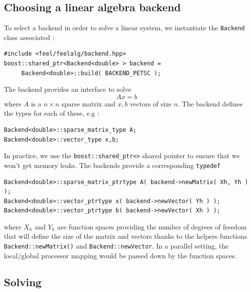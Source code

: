 \subsection{Choosing a linear algebra backend}
\label{sec:choos-line-algebra}

To select a backend in order to solve a linear system, we instantiate
the \lstinline!Backend! class associated :
\begin{lstlisting}
#include <feel/feelalg/backend.hpp>
boost::shared_ptr<Backend<double> > backend =
     Backend<double>::build( BACKEND_PETSC );
\end{lstlisting}
The backend provides an interface to solve
\begin{equation}
  \label{eq:8}
  A x = b
\end{equation}
where $A$ is a $n \times n $ sparse matrix and $x,b$ vectors of size $n$. The backend defines the \cpp types for  each of these, e.g :
\begin{lstlisting}
Backend<double>::sparse_matrix_type A;
Backend<double>::vector_type x,b;
\end{lstlisting}
In practice, we use the \lstinline!boost::shared_ptr<>! shared pointer
to ensure that we won't get memory leaks. The backends provide a
corresponding \lstinline!typedef!

\begin{lstlisting}
Backend<double>::sparse_matrix_ptrtype A( backend->newMatrix( Xh, Yh ) );
Backend<double>::vector_ptrtype x( backend->newVector( Yh ) );
Backend<double>::vector_ptrtype b( backend->newVector( Xh ) );
\end{lstlisting}
where $X_h$ and $Y_h$ are function spaces providing the number of
degrees of freedom that will define the size of the matrix and vectors
thanks to the helpers functions \lstinline!Backend::newMatrix()! and
\lstinline!Backend::newVector!. In a parallel setting, the
local/global processor mapping would be passed down by the function
spaces.


\subsection{Solving}
\label{sec:solving}

